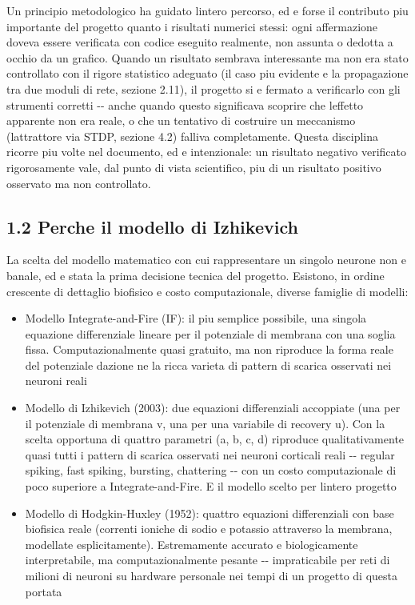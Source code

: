 \documentclass[
  italian,
]{article}
\begin{document}
Un principio metodologico ha guidato l\textquotesingle intero percorso, ed e\textquotesingle{} forse il contributo piu\textquotesingle{} importante del progetto quanto i risultati numerici stessi: ogni affermazione doveva essere verificata con codice eseguito realmente, non assunta o dedotta a occhio da un grafico. Quando un risultato sembrava interessante ma non era stato controllato con il rigore statistico adeguato (il caso piu\textquotesingle{} evidente e\textquotesingle{} la propagazione tra due moduli di rete, sezione 2.11), il progetto si e\textquotesingle{} fermato a verificarlo con gli strumenti corretti -\/- anche quando questo significava scoprire che l\textquotesingle effetto apparente non era reale, o che un tentativo di costruire un meccanismo (l\textquotesingle attrattore via STDP, sezione 4.2) falliva completamente. Questa disciplina ricorre piu\textquotesingle{} volte nel documento, ed e\textquotesingle{} intenzionale: un risultato negativo verificato rigorosamente vale, dal punto di vista scientifico, piu\textquotesingle{} di un risultato positivo osservato ma non controllato.

\subsection{1.2 Perche\textquotesingle{} il modello di Izhikevich}\label{perche-il-modello-di-izhikevich}

La scelta del modello matematico con cui rappresentare un singolo neurone non e\textquotesingle{} banale, ed e\textquotesingle{} stata la prima decisione tecnica del progetto. Esistono, in ordine crescente di dettaglio biofisico e costo computazionale, diverse famiglie di modelli:

\begin{itemize}
\item
  Modello Integrate-and-Fire (IF): il piu\textquotesingle{} semplice possibile, una singola equazione differenziale lineare per il potenziale di membrana con una soglia fissa. Computazionalmente quasi gratuito, ma non riproduce la forma reale del potenziale d\textquotesingle azione ne\textquotesingle{} la ricca varieta\textquotesingle{} di pattern di scarica osservati nei neuroni reali
\item
  Modello di Izhikevich (2003): due equazioni differenziali accoppiate (una per il potenziale di membrana v, una per una variabile di recovery u). Con la scelta opportuna di quattro parametri (a, b, c, d) riproduce qualitativamente quasi tutti i pattern di scarica osservati nei neuroni corticali reali -\/- regular spiking, fast spiking, bursting, chattering -\/- con un costo computazionale di poco superiore a Integrate-and-Fire. E\textquotesingle{} il modello scelto per l\textquotesingle intero progetto
\item
  Modello di Hodgkin-Huxley (1952): quattro equazioni differenziali con base biofisica reale (correnti ioniche di sodio e potassio attraverso la membrana, modellate esplicitamente). Estremamente accurato e biologicamente interpretabile, ma computazionalmente pesante -\/- impraticabile per reti di milioni di neuroni su hardware personale nei tempi di un progetto di questa portata
\end{itemize}
\end{document}
